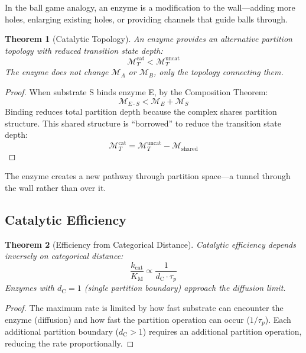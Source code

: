 \documentclass[twocolumn,10pt,a4paper]{article}
\newtheorem{theorem}{Theorem}[section]
\theoremstyle{definition}
\theoremstyle{remark}
\newcommand{\Depth}{\mathcal{M}}
\newcommand{\kcat}{k_{\mathrm{cat}}}
\newcommand{\Km}{K_{\mathrm{M}}}
\newcommand{\dC}{d_{\mathrm{C}}}
\begin{document}
In the ball game analogy, an enzyme is a modification to the wall---adding more holes, enlarging existing holes, or providing channels that guide balls through.

\begin{theorem}[Catalytic Topology]
\label{thm:catalysis}
An enzyme provides an alternative partition topology with reduced transition state depth:
\begin{equation}
    \Depth_T^{\mathrm{cat}} < \Depth_T^{\mathrm{uncat}}
\end{equation}
The enzyme does not change $\Depth_A$ or $\Depth_B$, only the topology connecting them.
\end{theorem}

\begin{proof}
When substrate S binds enzyme E, by the Composition Theorem:
\begin{equation}
    \Depth_{E \cdot S} < \Depth_E + \Depth_S
\end{equation}
Binding reduces total partition depth because the complex shares partition structure. This shared structure is ``borrowed'' to reduce the transition state depth:
\begin{equation}
    \Depth_T^{\mathrm{cat}} = \Depth_T^{\mathrm{uncat}} - \Depth_{\mathrm{shared}}
\end{equation}
\end{proof}

The enzyme creates a new pathway through partition space---a tunnel through the wall rather than over it.

\subsection{Catalytic Efficiency}

\begin{theorem}[Efficiency from Categorical Distance]
\label{thm:efficiency}
Catalytic efficiency depends inversely on categorical distance:
\begin{equation}
    \frac{\kcat}{\Km} \propto \frac{1}{\dC \cdot \tau_p}
\end{equation}
Enzymes with $\dC = 1$ (single partition boundary) approach the diffusion limit.
\end{theorem}

\begin{proof}
The maximum rate is limited by how fast substrate can encounter the enzyme (diffusion) and how fast the partition operation can occur ($1/\tau_p$). Each additional partition boundary ($\dC > 1$) requires an additional partition operation, reducing the rate proportionally.
\end{proof}
\end{document}

